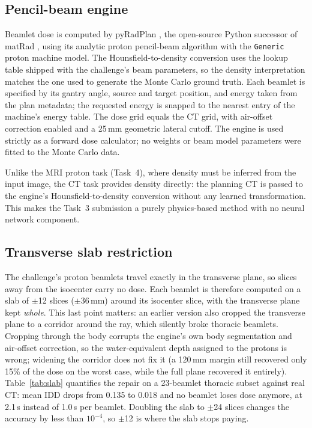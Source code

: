 \documentclass[runningheads]{llncs}
\begin{document}
\subsection{Pencil-beam engine}
Beamlet dose is computed by pyRadPlan \cite{pyradplan}, the open-source Python successor of matRad \cite{matrad}, using its analytic proton pencil-beam algorithm with the \texttt{Generic} proton machine model. The Hounsfield-to-density conversion uses the lookup table shipped with the challenge's beam parameters, so the density interpretation matches the one used to generate the Monte Carlo ground truth. Each beamlet is specified by its gantry angle, source and target position, and energy taken from the plan metadata; the requested energy is snapped to the nearest entry of the machine's energy table. The dose grid equals the CT grid, with air-offset correction enabled and a 25\,mm geometric lateral cutoff. The engine is used strictly as a forward dose calculator; no weights or beam model parameters were fitted to the Monte Carlo data.

Unlike the MRI proton task (Task~4), where density must be inferred from the input image, the CT task provides density directly: the planning CT is passed to the engine's Hounsfield-to-density conversion without any learned transformation. This makes the Task~3 submission a purely physics-based method with no neural network component.

\subsection{Transverse slab restriction}
\label{sec:slab}
The challenge's proton beamlets travel exactly in the transverse plane, so slices away from the isocenter carry no dose. Each beamlet is therefore computed on a slab of $\pm$12 slices ($\pm$36\,mm) around its isocenter slice, with the transverse plane kept \emph{whole}. This last point matters: an earlier version also cropped the transverse plane to a corridor around the ray, which silently broke thoracic beamlets. Cropping through the body corrupts the engine's own body segmentation and air-offset correction, so the water-equivalent depth assigned to the protons is wrong; widening the corridor does not fix it (a 120\,mm margin still recovered only 15\% of the dose on the worst case, while the full plane recovered it entirely). Table~\ref{tab:slab} quantifies the repair on a 23-beamlet thoracic subset against real CT: mean IDD drops from 0.135 to 0.018 and no beamlet loses dose anymore, at 2.1\,s instead of 1.0\,s per beamlet. Doubling the slab to $\pm$24 slices changes the accuracy by less than $10^{-4}$, so $\pm$12 is where the slab stops paying.
\end{document}
